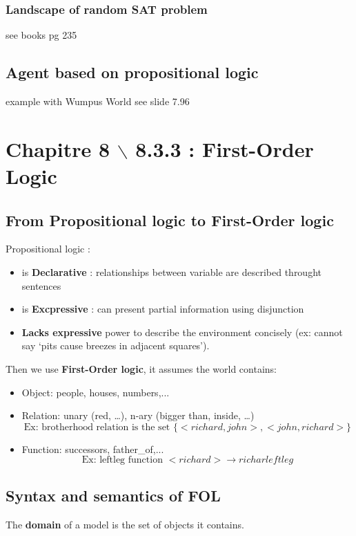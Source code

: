 \subsubsection{Landscape of random SAT problem}
see books pg 235

\subsection{Agent based on propositional logic}
example with Wumpus World see slide 7.96

\section{Chapitre 8 $\backslash$ 8.3.3 : First-Order Logic }

\subsection{From Propositional logic to First-Order logic}

 Propositional logic :
 \begin{itemize}
     \item is \textbf{Declarative} : relationships between variable are described throught sentences
     \item is \textbf{Excpressive} : can present partial information using disjunction
     \item \textbf{Lacks expressive}  power to describe the environment
     concisely (ex:  cannot say `pits  cause breezes in  adjacent squares').
\end{itemize}
 
 Then we use \textbf{First-Order logic}, it assumes the world contains:

	\begin{itemize}
		\item Object: people, houses, numbers,...
		\item Relation: unary (red, \ldots), n-ary (bigger than, inside, \ldots)
            $$\textrm{Ex: brotherhood relation is the set } \{<richard, john>, <john, richard>\}$$
		\item Function: successors, father\_of,...
            $$\textrm{Ex: leftleg function } <richard> \to richar leftleg$$
	\end{itemize}

\subsection{Syntax and semantics of FOL}
The \textbf{domain} of a model is the set of objects it contains.\\

